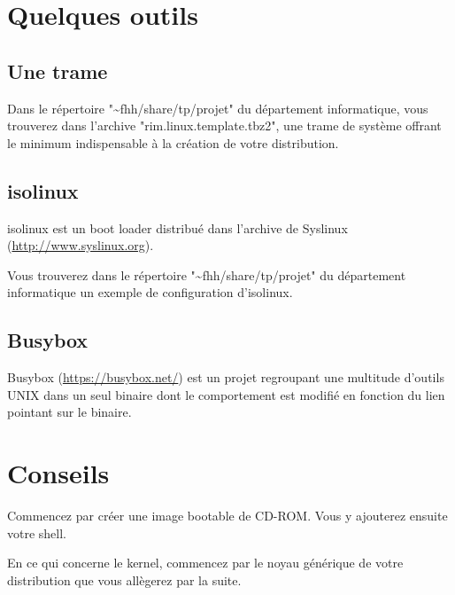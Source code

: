 \documentclass[11pt]{article}
\begin{document}
\section*{Quelques outils}

\subsection*{Une trame}

Dans le répertoire "\textasciitilde{}fhh/share/tp/projet" du département informatique, vous trouverez dans l'archive "rim.linux.template.tbz2", une trame de système offrant le minimum indispensable à la création de votre distribution.

\subsection*{isolinux}

isolinux est un boot loader distribué dans l'archive de Syslinux (\url{http://www.syslinux.org}).

Vous trouverez dans le répertoire "\textasciitilde{}fhh/share/tp/projet" du département informatique un exemple de configuration d'isolinux.

\subsection*{Busybox}

Busybox (\url{https://busybox.net/}) est un projet regroupant une multitude d'outils UNIX dans un seul binaire dont le comportement est modifié en fonction du lien pointant sur le binaire.

\section*{Conseils}

Commencez par créer une image bootable de CD-ROM. Vous y ajouterez ensuite votre shell.

En ce qui concerne le kernel, commencez par le noyau générique de votre distribution que vous allègerez par la suite.
\end{document}

